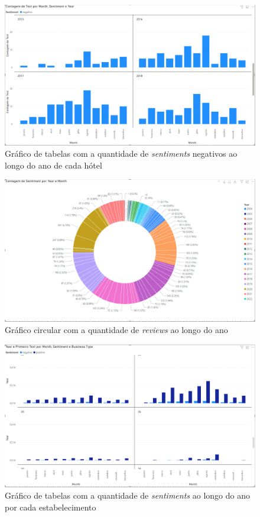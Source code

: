 \begin{figure}[!htb]
\centering
\includegraphics[width=12cm]{figuras/NegPerYear/1.PNG}
\caption{Gráfico de tabelas com a quantidade de \textit{sentiments} negativos ao longo do ano de cada hótel}
\label{fig:exemplofig}
\end{figure}

\begin{figure}[!htb]
\centering
\includegraphics[width=12cm]{figuras/NrReviewsPerYear/CircleGraph.PNG}
\caption{Gráfico circular com a quantidade de \textit{reviews} ao longo do ano}
\label{fig:exemplofig}
\end{figure}

\begin{figure}[!htb]
\centering
\includegraphics[width=12cm]{figuras/Pos&NegSentimentsPerMonth&BusinessType/2.PNG}
\caption{Gráfico de tabelas com a quantidade de \textit{sentiments} ao longo do ano por cada estabelecimento}
\label{fig:exemplofigNeg}
\end{figure}


